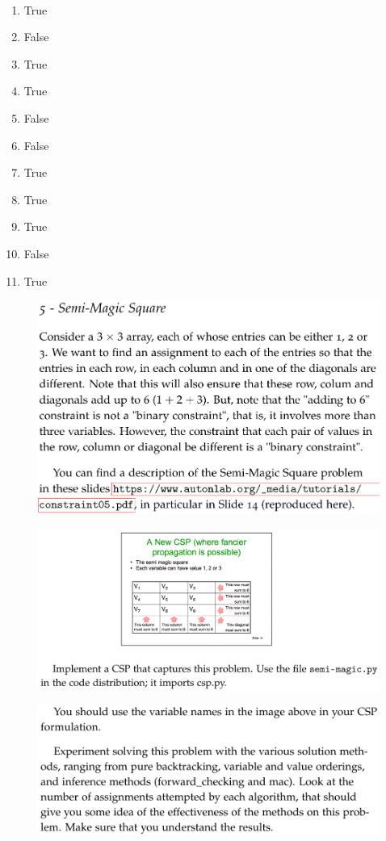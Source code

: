 \documentclass[12pt]{article}
\newenvironment{solution}[2][Solution]{\begin{trivlist}
\item[\hskip \labelsep {\bfseries #1}]}{\end{trivlist}}
\begin{document}
\pagebreak
\begin{solution}{}~
\begin{enumerate}
\item True
\item False
\item True
\item True
\item False
\item False
\item True
\item True
\item True
\item False
\item True
\end{enumerate}
\end{solution}

\begin{figure}[h!]
\includegraphics[width=\linewidth]{./assets/201807261948.png}
\end{figure}
\pagebreak
\begin{figure}[h!]
\includegraphics[width=\linewidth]{./assets/201807261949.png}
\end{figure}
\pagebreak
\begin{figure}[h!]
\includegraphics[width=\linewidth]{./assets/201807261950.png}
\end{figure}
\end{document}
